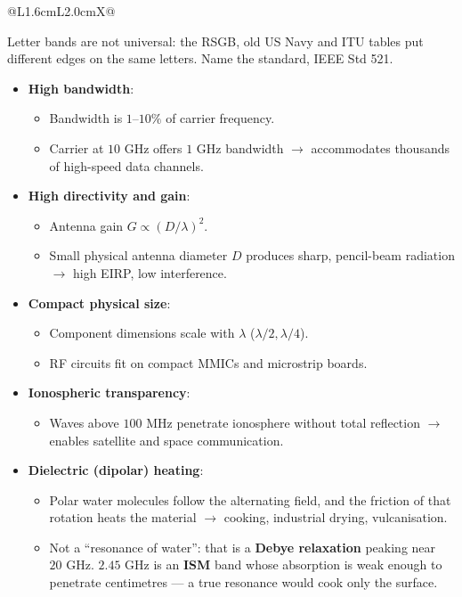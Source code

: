 {\begin{tabularx}{\linewidth}{@{}L{1.6cm}L{2.0cm}X@{}}
\bottomrule
\end{tabularx}
{\color{sub}\scriptsize \added{} Letter bands are not universal: the RSGB, old US Navy and
ITU tables put different edges on the same letters. Name the standard, IEEE Std 521.}}{%
\begin{itemize}
  \item \textbf{High bandwidth}:
  \begin{itemize}
    \item Bandwidth is $1\text{--}10\%$ of carrier frequency.
    \item Carrier at $10\text{ GHz}$ offers $1\text{ GHz}$ bandwidth $\rightarrow$ accommodates thousands of high-speed data channels.
  \end{itemize}
  \item \textbf{High directivity and gain}:
  \begin{itemize}
    \item Antenna gain $G \propto (D/\lambda)^2$.
    \item Small physical antenna diameter $D$ produces sharp, pencil-beam radiation $\rightarrow$ high EIRP, low interference.
  \end{itemize}
  \item \textbf{Compact physical size}:
  \begin{itemize}
    \item Component dimensions scale with $\lambda$ ($\lambda/2, \lambda/4$).
    \item RF circuits fit on compact MMICs and microstrip boards.
  \end{itemize}
  \item \textbf{Ionospheric transparency}:
  \begin{itemize}
    \item Waves above $100\text{ MHz}$ penetrate ionosphere without total reflection $\rightarrow$ enables satellite and space communication.
  \end{itemize}
  \item \textbf{Dielectric (dipolar) heating}:
  \begin{itemize}
    \item Polar water molecules follow the alternating field, and the friction of that rotation heats the material $\rightarrow$ cooking, industrial drying, vulcanisation.
    \item \added{} Not a ``resonance of water'': that is a \textbf{Debye relaxation} peaking near $20\text{ GHz}$. $2.45\text{ GHz}$ is an \textbf{ISM} band whose absorption is weak enough to penetrate centimetres --- a true resonance would cook only the surface.

\end{itemize}
\end{itemize}}
